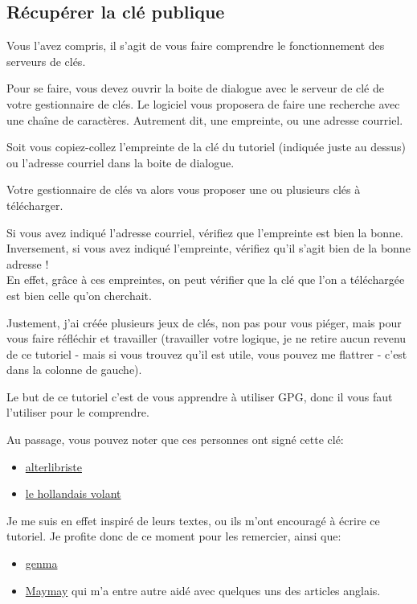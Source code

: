 \subsection{Récupérer la clé
publique}\label{ruxe9cupuxe9rer-la-cluxe9-publique}

Vous l'avez compris, il s'agit de vous faire comprendre le
fonctionnement des serveurs de clés.

Pour se faire, vous devez ouvrir la boite de dialogue avec le serveur de
clé de votre gestionnaire de clés. Le logiciel vous proposera de faire
une recherche avec une chaîne de caractères. Autrement dit, une
empreinte, ou une adresse courriel.

Soit vous copiez-collez l'empreinte de la clé du tutoriel (indiquée
juste au dessus) ou l'adresse courriel dans la boite de dialogue.

Votre gestionnaire de clés va alors vous proposer une ou plusieurs clés
à télécharger.

Si vous avez indiqué l'adresse courriel, vérifiez que l'empreinte est
bien la bonne.\\Inversement, si vous avez indiqué l'empreinte, vérifiez
qu'il s'agit bien de la bonne adresse !\\En effet, grâce à ces
empreintes, on peut vérifier que la clé que l'on a téléchargée est bien
celle qu'on cherchait.

Justement, j'ai créée plusieurs jeux de clés, non pas pour vous piéger,
mais pour vous faire réfléchir et travailler (travailler votre logique,
je ne retire aucun revenu de ce tutoriel - mais si vous trouvez qu'il
est utile, vous pouvez me flattrer - c'est dans la colonne de gauche).

Le but de ce tutoriel c'est de vous apprendre à utiliser GPG, donc il
vous faut l'utiliser pour le comprendre.

Au passage, vous pouvez noter que ces personnes ont signé cette clé:

\begin{itemize}
\itemsep1pt\parskip0pt
\item
  \href{http://alterlibriste.free.fr/}{alterlibriste}
\item
  \href{http://lehollandaisvolant.net/}{le hollandais volant}
\end{itemize}

Je me suis en effet inspiré de leurs textes, ou ils m'ont encouragé à
écrire ce tutoriel. Je profite donc de ce moment pour les remercier,
ainsi que:

\begin{itemize}
\itemsep1pt\parskip0pt
\item
  \href{http://genma.free.fr/}{genma}
\item
  \href{https://maymay.net/}{Maymay} qui m'a entre autre aidé avec
  quelques uns des articles anglais.
\end{itemize}


